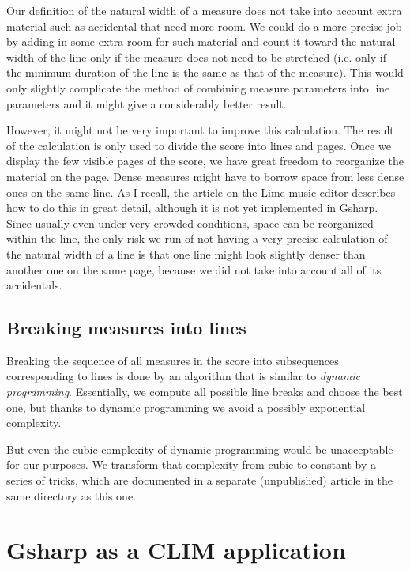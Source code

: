 \documentclass[11pt]{book}
\def\gs{Gsharp}
\def\clim{CLIM}
\begin{document}
Our definition of the natural width of a measure does not take into
account extra material such as accidental that need more room.  We
could do a more precise job by adding in some extra room for such
material and count it toward the natural width of the line only if the
measure does not need to be stretched (i.e. only if the minimum
duration of the line is the same as that of the measure).  This would
only slightly complicate the method of combining measure parameters
into line parameters and it might give a considerably better result. 

However, it might not be very important to improve this calculation.
The result of the calculation is only used to divide the score into
lines and pages.  Once we display the few visible pages of the score,
we have great freedom to reorganize the material on the page.  Dense
measures might have to borrow space from less dense ones on the same
line.  As I recall, the article on the Lime music editor describes how
to do this in great detail, although it is not yet implemented in
{\gs}.  Since usually even under very crowded conditions, space can be
reorganized within the line, the only risk we run of not having a very
precise calculation of the natural width of a line is that one line
might look slightly denser than another one on the same page, because
we did not take into account all of its accidentals. 

\section{Breaking measures into lines}

Breaking the sequence of all measures in the score into subsequences
corresponding to lines is done by an algorithm that is similar to
\emph{dynamic programming}.  Essentially, we compute all possible line
breaks and choose the best one, but thanks to dynamic programming we
avoid a possibly exponential complexity.  

But even the cubic complexity of dynamic programming would be
unacceptable for our purposes.  We transform that complexity from
cubic to constant by a series of tricks, which are documented in a
separate (unpublished) article in the same directory as this one. 

\chapter{{\gs} as a {\clim} application}
\end{document}
